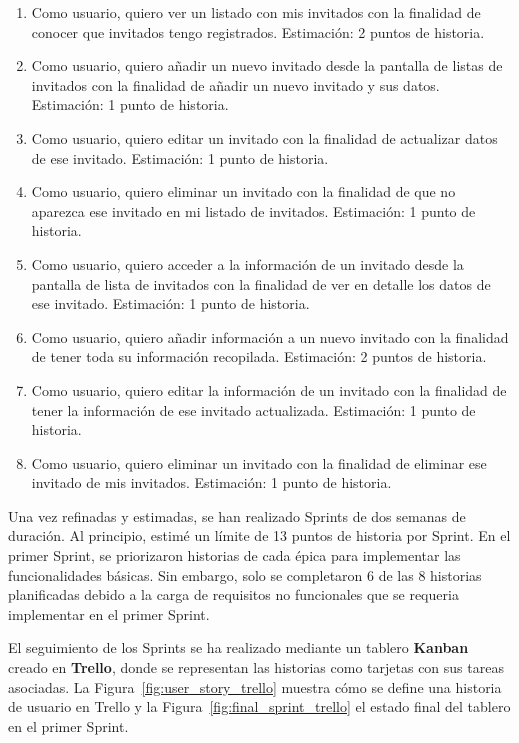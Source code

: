 \begin{enumerate}
  \item Como usuario, quiero ver un listado con mis invitados con la finalidad de conocer que invitados tengo registrados. Estimación: 2 puntos de historia.
  \item Como usuario, quiero añadir un nuevo invitado desde la pantalla de listas de invitados con la finalidad de añadir un nuevo invitado y sus datos. Estimación: 1 punto de historia.
  \item Como usuario, quiero editar un invitado con la finalidad de actualizar datos de ese invitado. Estimación: 1 punto de historia.
  \item Como usuario, quiero eliminar un invitado con la finalidad de que no aparezca ese invitado en mi listado de invitados. Estimación: 1 punto de historia.
  \item Como usuario, quiero acceder a la información de un invitado desde la pantalla de lista de invitados con la finalidad de ver en detalle los datos de ese invitado. Estimación: 1 punto de historia.
  \item Como usuario, quiero añadir información a un nuevo invitado con la finalidad de tener toda su información recopilada. Estimación: 2 puntos de historia.
  \item Como usuario, quiero editar la información de un invitado con la finalidad de tener la información de ese invitado actualizada. Estimación: 1 punto de historia.
  \item Como usuario, quiero eliminar un invitado con la finalidad de eliminar ese invitado de mis invitados. Estimación: 1 punto de historia.
\end{enumerate}

Una vez refinadas y estimadas, se han realizado Sprints de dos semanas de duración. Al principio, estimé un límite de 13 puntos de historia por Sprint. En el primer Sprint, se priorizaron historias de cada épica para implementar las funcionalidades básicas. Sin embargo, solo se completaron 6 de las 8 historias planificadas debido a la carga de requisitos no funcionales que se requeria implementar en el primer Sprint.

El seguimiento de los Sprints se ha realizado mediante un tablero \textbf{Kanban} creado en \textbf{Trello}, donde se representan las historias como tarjetas con sus tareas asociadas. La Figura~\ref{fig:user_story_trello} muestra cómo se define una historia de usuario en Trello y la Figura~\ref{fig:final_sprint_trello} el estado final del tablero en el primer Sprint.


